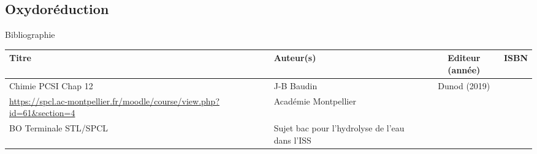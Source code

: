 \begin{headerBlock}
\chapter{Oxydoréduction}
\label{LC_Oxydoreduction_SPCL}
 \end{headerBlock}



\begin{reportBlock}{Bibliographie}

\begin{center}
\begin{tabularx}{\textwidth}{| X | X | c | c |}\hline
Titre & Auteur(s) & Editeur (année) & ISBN \\ \hline
 Chimie PCSI Chap 12 & J-B Baudin & Dunod (2019) &  \\ 
 \hline
 \url{https://spcl.ac-montpellier.fr/moodle/course/view.php?id=61&section=4} & Académie Montpellier & & \\
 \hline
 BO Terminale STL/SPCL & Sujet bac pour l'hydrolyse de l'eau dans l'ISS & & \\
\end{tabularx}
\end{center}

\end{reportBlock}

